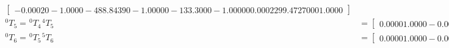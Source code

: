 \begin{equation*}
\begin{split}
\begin{bmatrix}
                                                                          -0.0002	0	-1.0000	-488.8439
                                                                          0	-1.0000	0	-133.3000
                                                                          -1.0000	0	0.0002	299.4727
                                                                          0	0	0	1.0000
                                                                      \end{bmatrix}     \\
        ^{0}T_{5} = \hspace{1pt} ^{0}T_{4} \hspace{1pt} ^{4}T_{5} & = \begin{bmatrix}
                                                                          0.0000	1.0000	-0.0002	-588.5439
                                                                          1.0000	0	0.0002	-133.3000
                                                                          0.0002	-0.0002	-1.0000	299.4931
                                                                          0	0	0	1.0000
                                                                      \end{bmatrix} \\
        ^{0}T_{6} = \hspace{1pt} ^{0}T_{5} \hspace{1pt} ^{5}T_{6} & = \begin{bmatrix}
                                                                          0.0000	1.0000	-0.0002	-588.5642
                                                                          1.0000	0	0.0002	-133.2797
                                                                          0.0002	-0.0002	-1.0000	199.8931
                                                                          0	0	0	1.0000
                                                                      \end{bmatrix}
    \end{split}
\end{equation*}